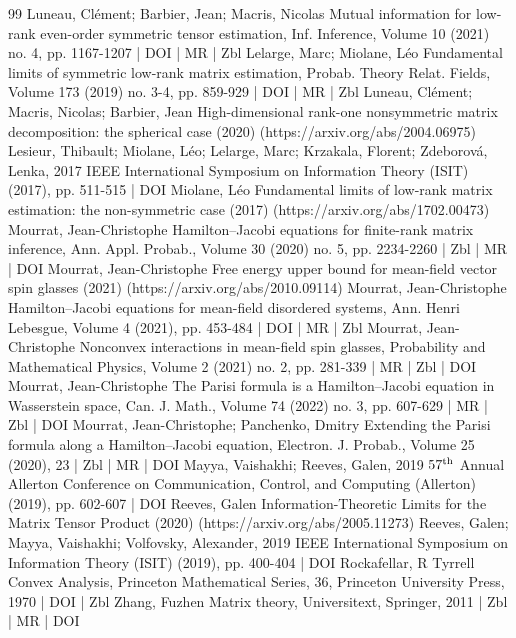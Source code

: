 \documentclass[10pt]{amsart}
\theoremstyle{definition}\newtheorem{defi}[theo]{Definition}\newtheorem{rema}[theo]{Remark}\newtheorem{exam}[theo]{Example}\newtheorem{exem}[theo]{Example}\newtheorem{nota}[theo]{Notation}
\begin{document}
\begin{thebibliography}{99}
Luneau, Clément; Barbier, Jean; Macris, Nicolas Mutual information for low-rank even-order symmetric tensor estimation, Inf. Inference, Volume 10 (2021) no. 4, pp. 1167-1207 | DOI | MR | Zbl
Lelarge, Marc; Miolane, Léo Fundamental limits of symmetric low-rank matrix estimation, Probab. Theory Relat. Fields, Volume 173 (2019) no. 3-4, pp. 859-929 | DOI | MR | Zbl
Luneau, Clément; Macris, Nicolas; Barbier, Jean High-dimensional rank-one nonsymmetric matrix decomposition: the spherical case (2020) (https://arxiv.org/abs/2004.06975)
Lesieur, Thibault; Miolane, Léo; Lelarge, Marc; Krzakala, Florent; Zdeborová, Lenka, 2017 IEEE International Symposium on Information Theory (ISIT) (2017), pp. 511-515 | DOI
Miolane, Léo Fundamental limits of low-rank matrix estimation: the non-symmetric case (2017) (https://arxiv.org/abs/1702.00473)
Mourrat, Jean-Christophe Hamilton–Jacobi equations for finite-rank matrix inference, Ann. Appl. Probab., Volume 30 (2020) no. 5, pp. 2234-2260 | Zbl | MR | DOI
Mourrat, Jean-Christophe Free energy upper bound for mean-field vector spin glasses (2021) (https://arxiv.org/abs/2010.09114)
Mourrat, Jean-Christophe Hamilton–Jacobi equations for mean-field disordered systems, Ann. Henri Lebesgue, Volume 4 (2021), pp. 453-484 | DOI | MR | Zbl
Mourrat, Jean-Christophe Nonconvex interactions in mean-field spin glasses, Probability and Mathematical Physics, Volume 2 (2021) no. 2, pp. 281-339 | MR | Zbl | DOI
Mourrat, Jean-Christophe The Parisi formula is a Hamilton–Jacobi equation in Wasserstein space, Can. J. Math., Volume 74 (2022) no. 3, pp. 607-629 | MR | Zbl | DOI
Mourrat, Jean-Christophe; Panchenko, Dmitry Extending the Parisi formula along a Hamilton–Jacobi equation, Electron. J. Probab., Volume 25 (2020), 23 | Zbl | MR | DOI
Mayya, Vaishakhi; Reeves, Galen, 2019 $57^{\rm th}$ Annual Allerton Conference on Communication, Control, and Computing (Allerton) (2019), pp. 602-607 | DOI
Reeves, Galen Information-Theoretic Limits for the Matrix Tensor Product (2020) (https://arxiv.org/abs/2005.11273)
Reeves, Galen; Mayya, Vaishakhi; Volfovsky, Alexander, 2019 IEEE International Symposium on Information Theory (ISIT) (2019), pp. 400-404 | DOI
Rockafellar, R Tyrrell Convex Analysis, Princeton Mathematical Series, 36, Princeton University Press, 1970 | DOI | Zbl
Zhang, Fuzhen Matrix theory, Universitext, Springer, 2011 | Zbl | MR | DOI
\end{thebibliography}
\end{document}
